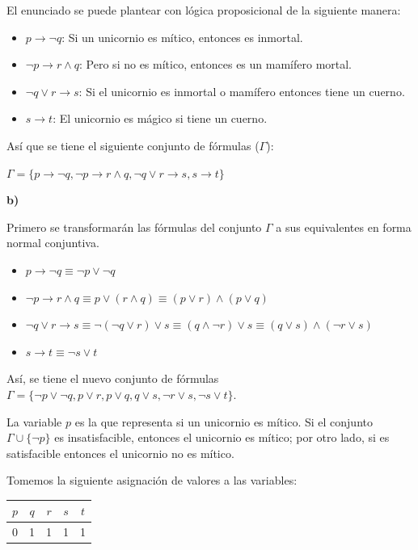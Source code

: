 \documentclass{article}
\begin{document}
El enunciado se puede plantear con lógica proposicional de la siguiente manera:

\begin{itemize}
\item $p \rightarrow \lnot q$: Si un unicornio es mítico, entonces es inmortal.
\item $\lnot p \rightarrow r \land q$: Pero si no es mítico, entonces es un mamífero mortal.
\item $\lnot q \lor r \rightarrow s$: Si el unicornio es inmortal o mamífero entonces tiene un cuerno.
\item $s \rightarrow t$: El unicornio es mágico si tiene un cuerno.
\end{itemize}

Así que se tiene el siguiente conjunto de fórmulas ($\Gamma$):

$\Gamma = \{p \rightarrow \lnot q, \lnot p \rightarrow r \land q, \lnot q \lor r \rightarrow s, s \rightarrow t\}$

\textbf{b)}

Primero se transformarán las fórmulas del conjunto $\Gamma$ a sus equivalentes en forma normal conjuntiva.

\begin{itemize}
\item $p \rightarrow \lnot q \equiv \lnot p \lor \lnot q$
\item $\lnot p \rightarrow r \land q \equiv p \lor (r \land q) \equiv (p \lor r) \land (p \lor q)$
\item $\lnot q \lor r \rightarrow s \equiv \lnot (\lnot q \lor r) \lor s \equiv (q \land \lnot r) \lor s \equiv (q \lor s) \land (\lnot r \lor s)$
\item $s \rightarrow t \equiv \lnot s \lor t$
\end{itemize}

Así, se tiene el nuevo conjunto de fórmulas $\Gamma = \{\lnot p \lor \lnot q, p \lor r, p \lor q, q \lor s, \lnot r \lor s, \lnot s \lor t\}$.

La variable $p$ es la que representa si un unicornio es mítico. Si el conjunto $\Gamma \cup \{\lnot p\}$ es insatisfacible, entonces el unicornio es mítico; por otro lado, si es satisfacible entonces el unicornio no es mítico.

Tomemos la siguiente asignación de valores a las variables:

\begin{tabular}{|c|c|c|c|c|}
\hline
$p$ & $q$ & $r$ & $s$ & $t$ \\ \hline
 0  &  1  &  1  &  1  &  1  \\ \hline  
\end{tabular}
\end{document}
